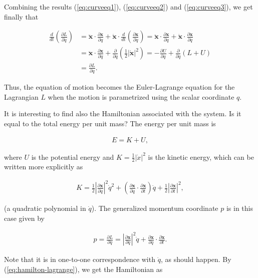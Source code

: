 \documentclass[11pt]{report}
\theoremstyle{plain}
\theoremstyle{definition}
\begin{document}
Combining the results (\ref{eq:curveeq1}),
(\ref{eq:curveeq2}) and (\ref{eq:curveeq3}), we get finally
that

\begin{align*}
\frac{d}{dt}\left(\frac{\partial L}{\partial \dot{q}}\right)
&=
\ddot{\mathbf{x}} \cdot \frac{\partial \mathbf{x}}{\partial q}
+ \dot{\mathbf{x}}\cdot \frac{d}{dt}\left( \frac{\partial \mathbf{x}}{\partial q}\right)
=
\ddot{\mathbf{x}} \cdot \frac{\partial \mathbf{x}}{\partial q}
+ \dot{\mathbf{x}} \cdot \frac{\partial \dot{\mathbf{x}}}{\partial q} \\
&=
\ddot{\mathbf{x}} \cdot \frac{\partial \mathbf{x}}{\partial q}
+ \frac{\partial }{\partial q}\left(\tfrac12|\dot{\mathbf{x}}|^2\right)
= -\frac{\partial U}{\partial q}+\frac{\partial }{\partial q}(L+U) \\
&= \frac{\partial L}{\partial q}.
\end{align*}

Thus, the equation of motion becomes the
Euler-Lagrange equation for the Lagrangian $L$ when
the motion is parametrized using the scalar coordinate
$q$.

It is interesting to find also the Hamiltonian
associated with the system. Is it equal to the total
energy per unit mass? The energy per unit mass is

\begin{align*}
E = K + U,
\end{align*}

where $U$ is the potential energy and
$K = \tfrac12|\dot{x}|^2$ is the kinetic energy,
which can be written more explicitly as

\begin{align*}
K = \tfrac12 \left|\frac{\partial \mathbf{x}}{\partial q}\right|^2 \dot{q}^2 + \left(\frac{\partial \mathbf{x}}{\partial q}\cdot\frac{\partial \mathbf{x}}{\partial t}\right)
\dot{q} + \tfrac12\left|\frac{\partial \mathbf{x}}{\partial t}\right|^2,
\end{align*}

(a quadratic polynomial in $\dot{q}$). The
generalized momentum coordinate $p$ is in this case
given by

\begin{align*}
p = \frac{\partial L}{\partial \dot{q}} =
\left|\frac{\partial \mathbf{x}}{\partial q}\right|^2 \dot{q} + \frac{\partial \mathbf{x}}{\partial q}\cdot\frac{\partial \mathbf{x}}{\partial t}.
\end{align*}

Note that it is in one-to-one correspondence with
$\dot{q}$, as should happen. By
(\ref{eq:hamilton-lagrange}), we get the Hamiltonian as
\end{document}
